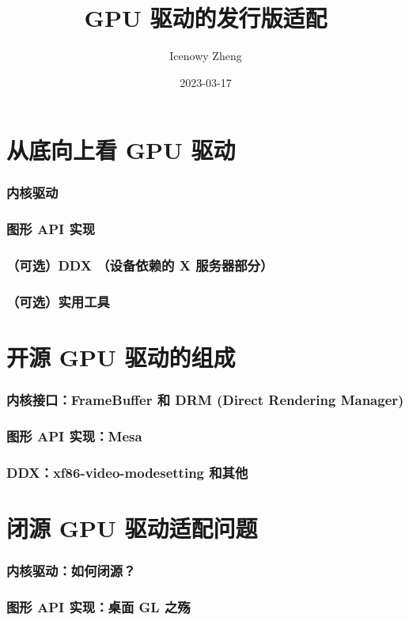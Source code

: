 \documentclass{ctexbeamer}
\title{GPU 驱动的发行版适配}
\author{Icenowy Zheng}
\institute{PLCT 实验室}
\date{2023-03-17}
\begin{document}
\frame{\titlepage}

\section{从底向上看 GPU 驱动}

\begin{frame}
    \frametitle{内核驱动}

\end{frame}

\begin{frame}
    \frametitle{图形 API 实现}
\end{frame}

\begin{frame}
    \frametitle{（可选）DDX （设备依赖的 X 服务器部分）}
\end{frame}

\begin{frame}
    \frametitle{（可选）实用工具}
\end{frame}

\section{开源 GPU 驱动的组成}

\begin{frame}
    \frametitle{内核接口：FrameBuffer 和 DRM (Direct Rendering Manager)}
\end{frame}

\begin{frame}
    \frametitle{图形 API 实现：Mesa}
\end{frame}

\begin{frame}
    \frametitle{DDX：xf86-video-modesetting 和其他}
\end{frame}

\section{闭源 GPU 驱动适配问题}

\begin{frame}
    \frametitle{内核驱动：如何闭源？}
\end{frame}

\begin{frame}
    \frametitle{图形 API 实现：桌面 GL 之殇}
\end{frame}
\end{document}

